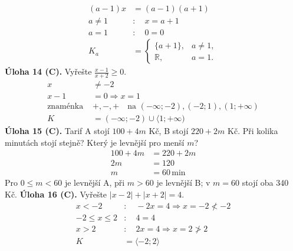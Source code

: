 \documentclass[11pt,a4paper]{article}
\begin{document}
\[\begin{aligned}
(a-1)x&=(a-1)(a+1) \\
a\ne1&:\quad x=a+1 \\
a=1&:\quad0=0 \\
K_a&=\begin{cases}\{a+1\},&a\ne1,\\\mathbb R,&a=1.\end{cases}
\end{aligned}\]
\noindent\textbf{Úloha 14 (C).} Vyřešte $\frac{x-1}{x+2}\ge0$.
\[\begin{aligned}
x&\ne-2 \\
x-1&=0\Rightarrow x=1 \\
\text{znaménka }&+,-,+\quad\text{na }(-\infty;-2),(-2;1),(1;+\infty) \\
K&=(-\infty;-2)\cup\langle1;+\infty)
\end{aligned}\]
\noindent\textbf{Úloha 15 (C).} Tarif A stojí $100+4m$ Kč, B stojí $220+2m$ Kč. Při kolika minutách stojí stejně? Který je levnější pro menší $m$?
\[\begin{aligned}
100+4m&=220+2m \\
2m&=120 \\
m&=60\,\mathrm{min}
\end{aligned}\]
\noindent Pro $0\le m<60$ je levnější A, při $m>60$ je levnější B; v $m=60$ stojí oba 340 Kč.
\noindent\textbf{Úloha 16 (C).} Vyřešte $|x-2|+|x+2|=4$.
\[\begin{aligned}
x<-2&:\quad-2x=4\Rightarrow x=-2\not<-2 \\
-2\le x\le2&:\quad4=4 \\
x>2&:\quad2x=4\Rightarrow x=2\not>2 \\
K&=\langle-2;2\rangle
\end{aligned}\]
\end{document}
